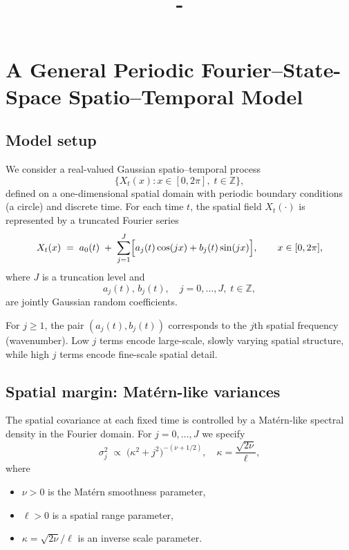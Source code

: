\documentclass[answers,12pt,addpoints]{exam}
\author{\name}
\title{\course \\ - \assignment}
\begin{document}
\maketitle

\section{A General Periodic Fourier--State-Space Spatio--Temporal Model}

\subsection{Model setup}

We consider a real-valued Gaussian spatio--temporal process
\[
  \{X_t(x) : x \in [0,2\pi],\; t \in \mathbb{Z}\},
\]
defined on a one-dimensional spatial domain with periodic boundary conditions (a circle) and discrete time. For each time $t$, the spatial field $X_t(\cdot)$ is represented by a truncated Fourier series
\begin{equation}
  X_t(x)
  \;=\;
  a_0(t)
  \;+\;
  \sum_{j=1}^{J}
    \Bigl[
      a_j(t)\cos(jx) + b_j(t)\sin(jx)
    \Bigr],
  \qquad x \in [0,2\pi],
  \label{eq:Xt-fourier}
\end{equation}
where $J$ is a truncation level and
\[
  a_j(t),\, b_j(t), \quad j=0,\dots,J,\; t\in\mathbb{Z},
\]
are jointly Gaussian random coefficients.

For $j \ge 1$, the pair $(a_j(t), b_j(t))$ corresponds to the $j$th spatial frequency (wavenumber). Low $j$ terms encode large-scale, slowly varying spatial structure, while high $j$ terms encode fine-scale spatial detail.

\subsection{Spatial margin: Matérn-like variances}

The spatial covariance at each fixed time is controlled by a Matérn-like spectral density in the Fourier domain. For $j = 0,\dots,J$ we specify
\begin{equation}
  \sigma_j^2
  \;\propto\;
  \bigl(\kappa^2 + j^2\bigr)^{-(\nu + 1/2)},
  \quad
  \kappa = \frac{\sqrt{2\nu}}{\ell},
  \label{eq:matern-spectrum}
\end{equation}
where
\begin{itemize}
  \item $\nu > 0$ is the Matérn smoothness parameter,
  \item $\ell > 0$ is a spatial range parameter,
  \item $\kappa = \sqrt{2\nu}/\ell$ is an inverse scale parameter.
\end{itemize}
\end{document}
